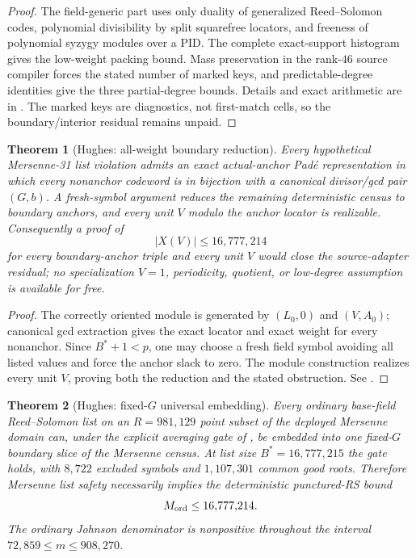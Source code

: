 \documentclass[11pt,a4paper]{amsart}
\numberwithin{equation}{section}
\newtheorem{theorem}{Theorem}[section]
\theoremstyle{remark}
\begin{document}
\begin{proof}
The field-generic part uses only duality of generalized Reed--Solomon codes, polynomial divisibility by split squarefree locators, and freeness of polynomial syzygy modules over a PID.  The complete exact-support histogram gives the low-weight packing bound.  Mass preservation in the rank-$46$ source compiler forces the stated number of marked keys, and predictable-degree identities give the three partial-degree bounds.  Details and exact arithmetic are in \cite{HughesM31Source26}.  The marked keys are diagnostics, not first-match cells, so the boundary/interior residual remains unpaid.
\end{proof}

\begin{theorem}[Hughes: all-weight boundary reduction]\label{thm:m31-boundary-reduction}
Every hypothetical Mersenne-31 list violation admits an exact actual-anchor Pad\'e representation in which every nonanchor codeword is in bijection with a canonical divisor/gcd pair $(G,b)$.  A fresh-symbol argument reduces the remaining deterministic census to boundary anchors, and every unit $V$ modulo the anchor locator is realizable.  Consequently a proof of
\[
 |X(V)|\le16{,}777{,}214
\]
for every boundary-anchor triple and every unit $V$ would close the source-adapter residual; no specialization $V=1$, periodicity, quotient, or low-degree assumption is available for free.
\end{theorem}

\begin{proof}
The correctly oriented module is generated by $(L_0,0)$ and $(V,A_0)$; canonical gcd extraction gives the exact locator and exact weight for every nonanchor.  Since $B^*+1<p$, one may choose a fresh field symbol avoiding all listed values and force the anchor slack to zero.  The module construction realizes every unit $V$, proving both the reduction and the stated obstruction.  See \cite{HughesM31Boundary26}.
\end{proof}

\begin{theorem}[Hughes: fixed-$G$ universal embedding]\label{thm:m31-fixed-g}
Every ordinary base-field Reed--Solomon list on an $R=981{,}129$ point subset of the deployed Mersenne domain can, under the explicit averaging gate of \cite{HughesM31FixedG26}, be embedded into one fixed-$G$ boundary slice of the Mersenne census.  At list size $B^*=16{,}777{,}215$ the gate holds, with $8{,}722$ excluded symbols and $1{,}107{,}301$ common good roots.  Therefore Mersenne list safety necessarily implies the deterministic punctured-RS bound
\[
 M_{\rm ord}\le16{,}777{,}214.
\]
The ordinary Johnson denominator is nonpositive throughout the interval $72{,}859\le m\le908{,}270$.
\end{theorem}
\end{document}

